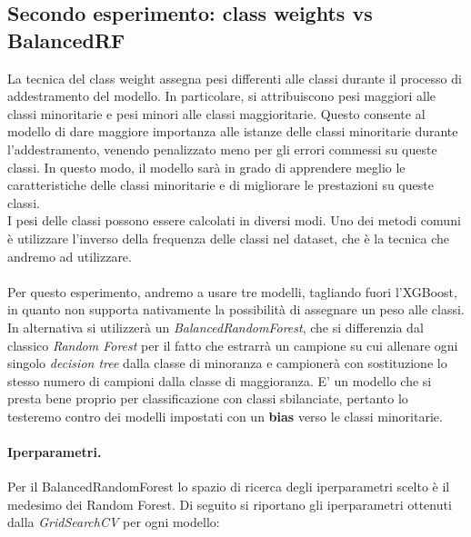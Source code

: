 \subsection{Secondo esperimento: class weights vs BalancedRF}
\noindent La tecnica del class weight assegna pesi differenti alle classi durante il processo di addestramento del modello. In particolare, si attribuiscono pesi maggiori alle classi minoritarie e pesi minori alle classi maggioritarie. Questo consente al modello di dare maggiore importanza alle istanze delle classi minoritarie durante l'addestramento, venendo penalizzato meno per gli errori commessi su queste classi. In questo modo, il modello sarà in grado di apprendere meglio le caratteristiche delle classi minoritarie e di migliorare le prestazioni su queste classi.\\
I pesi delle classi possono essere calcolati in diversi modi. Uno dei metodi comuni è utilizzare l'inverso della frequenza delle classi nel dataset, che è la tecnica che andremo ad utilizzare.\\ \\ Per questo esperimento, andremo a usare tre modelli, tagliando fuori l'XGBoost, in quanto non supporta nativamente la possibilità di assegnare un peso alle classi.\\ In alternativa si utilizzerà un \textit{BalancedRandomForest}, che si differenzia dal classico \textit{Random Forest} per il fatto che estrarrà un campione su cui allenare ogni singolo \textit{decision tree} dalla classe di minoranza e campionerà con sostituzione lo stesso numero di campioni dalla classe di maggioranza. E' un modello che si presta bene proprio per classificazione con classi sbilanciate, pertanto lo testeremo contro dei modelli impostati con un \textbf{bias} verso le classi minoritarie.

\paragraph{Iperparametri.} Per il BalancedRandomForest lo spazio di ricerca degli iperparametri scelto è il medesimo dei Random Forest. Di seguito si riportano gli iperparametri ottenuti dalla \textit{GridSearchCV} per ogni modello:

